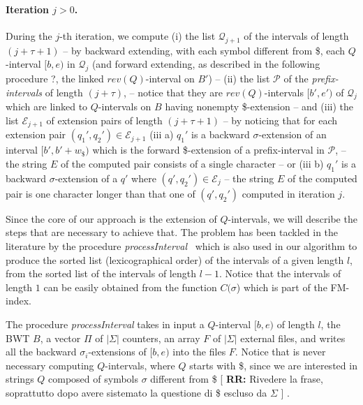 \documentclass[runningheads,envcountsame,a4paper]{llncs}
\newcommand{\notaestesa}[2]{%
 \marginpar{\color{red!75!black}\textbf{\texttimes}}%
 {\color{red!75!black}%
 [\,\textbullet\,\textsf{\textbf{#1:}} %
 \textsf{\footnotesize#2}\,\textbullet\,]}%
}
\begin{document}
\paragraph{Iteration $j > 0$.}
During the $j$-th iteration, we compute
(i) the list $\mathcal{Q}_{j+1}$ of the
intervals of length $(j+\tau+1)$  -- by backward extending, with each symbol different from \$, each $Q$-interval $[b, e)$ in $\mathcal{Q}_{j}$ (and forward extending, as described in the following procedure ?, the
linked $rev(Q)$-interval on $B'$)  --
(ii) the list $\mathcal{P}$ of the
\emph{prefix-intervals} of length $(j+\tau)$, -- notice that they are $rev(Q)$-intervals $[b',e')$ of $\mathcal{Q}_j$ which are linked to $Q$-intervals on $B$ having nonempty \$-extension   --
and
(iii) the list $\mathcal{E}_{j+1}$ of
extension pairs of length $(j+\tau+1)$ -- by noticing that for each extension pair
$(q_{1}',q_{2}')\in \mathcal{E}_{j+1}$ (iii a) $q_{1}'$ is a backward $\sigma$-extension
of an interval $[b',b'+w_\$)$ which is the forward \$-extension of a prefix-interval in $\mathcal{P}$,  -- the string $E$ of the computed pair consists of a single character -- or  (iii b)
$q_{1}'$ is a backward $\sigma$-extension
of a $q'$ where $(q',q_{2}')\in \mathcal{E}_{j}$ -- the string $E$ of the computed pair is one
character longer than that one of $(q', q_{2}')$ computed in iteration $j$.



Since the core of our approach is the extension of $Q$-intervals, we will
describe the steps that are necessary to achieve that.
The problem has been tackled in the literature by
the procedure \emph{processInterval}~\cite{Cox2012} which is also used in our algorithm to produce the sorted list
(lexicographical order) of the intervals of a given length $l$, from the
sorted list of the intervals of length $l-1$. Notice that the intervals of length $1$
can be easily obtained from the  function $C(\sigma$) which is part of the FM-index.

The procedure \emph{processInterval} takes in input a $Q$-interval $[b,e)$ of
length $l$, the BWT $B$, a vector $\Pi$ of $|\Sigma|$ counters, an array $F$ of
$|\Sigma|$ external files, and writes all the backward $\sigma_i$-extensions of
$[b,e)$ into the files $F$. Notice that is never necessary computing $Q$-intervals, where $Q$ starts with \$, since we are interested in strings $Q$ composed of symbols $\sigma$ different from \$ \notaestesa{RR}{Rivedere la frase, soprattutto dopo avere sistemato la questione di \$ escluso da $\Sigma$}.
\end{document}
